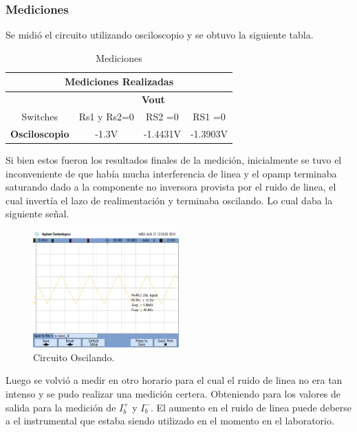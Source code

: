 \subsubsection{Mediciones}
Se midió el circuito utilizando osciloscopio y se  obtuvo la siguiente tabla.
\begin{table}[H]
\begin{center}
\label{tab:vout}
\caption{Mediciones}
\begin{tabular}{c|c|c|c|}
\hline
\multicolumn{4}{|c|}{\textbf{Mediciones Realizadas}} \\ \hline
 & \multicolumn{3}{c|}{\textbf{Vout}} \\ \cline{2-4} 
Switches & Rs1 y Rs2=0 & RS2 =0 & RS1 =0 \\ \hline
\multicolumn{1}{|c|}{\textbf{Osciloscopio}} & -1.3V & -1.4431V & -1.3903V \\ \hline
\end{tabular}
\end{center}
\end{table}
Si bien estos fueron los resultados finales de la medición, inicialmente se tuvo el inconveniente de que había mucha interferencia de linea y el opamp terminaba saturando dado a la componente no inversora provista por el ruido de linea, el cual invertía el lazo de realimentación y terminaba oscilando.
Lo cual daba la siguiente señal.
\begin{figure}[H]	
	\centering
	\includegraphics[width=0.5\textwidth]{Ej3/imagenes/opmpOscilando.png}
	\caption{Circuito Oscilando.}
	\label{fig:oscilando}
\end{figure}
Luego se volvió a medir en otro horario para el cual el ruido de linea no era tan intenso y  se pudo realizar una medición certera. Obteniendo para los valores de salida para la medición de $I_b^+$ y $I_b^-$. El aumento en el ruido de linea puede deberse a el instrumental que estaba siendo utilizado en el momento en el laboratorio.
